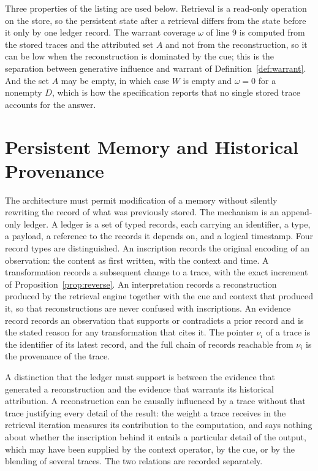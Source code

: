 Three properties of the listing are used below. Retrieval is a read-only operation on the store, so the persistent state after a retrieval differs from the state before it only by one ledger record. The warrant coverage $\omega$ of line 9 is computed from the stored traces and the attributed set $A$ and not from the reconstruction, so it can be low when the reconstruction is dominated by the cue; this is the separation between generative influence and warrant of Definition~\ref{def:warrant}. And the set $A$ may be empty, in which case $W$ is empty and $\omega=0$ for a nonempty $D$, which is how the specification reports that no single stored trace accounts for the answer.


\chapter{Persistent Memory and Historical Provenance}\label{ch:provenance}

The architecture must permit modification of a memory without silently rewriting the record of what was previously stored. The mechanism is an append-only ledger. A ledger is a set of typed records, each carrying an identifier, a type, a payload, a reference to the records it depends on, and a logical timestamp. Four record types are distinguished. An inscription records the original encoding of an observation: the content as first written, with the context and time. A transformation records a subsequent change to a trace, with the exact increment of Proposition~\ref{prop:reverse}. An interpretation records a reconstruction produced by the retrieval engine together with the cue and context that produced it, so that reconstructions are never confused with inscriptions. An evidence record records an observation that supports or contradicts a prior record and is the stated reason for any transformation that cites it. The pointer $\nu_i$ of a trace is the identifier of its latest record, and the full chain of records reachable from $\nu_i$ is the provenance of the trace.

A distinction that the ledger must support is between the evidence that generated a reconstruction and the evidence that warrants its historical attribution. A reconstruction can be causally influenced by a trace without that trace justifying every detail of the result: the weight a trace receives in the retrieval iteration measures its contribution to the computation, and says nothing about whether the inscription behind it entails a particular detail of the output, which may have been supplied by the context operator, by the cue, or by the blending of several traces. The two relations are recorded separately.

